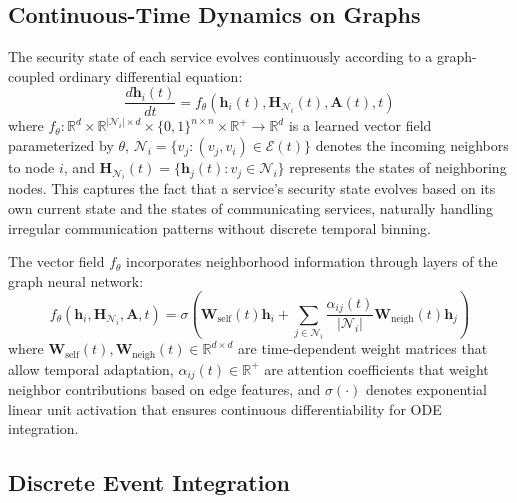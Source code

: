 \documentclass[lettersize,journal]{IEEEtran}
\newcommand{\R}{\mathbb{R}}
\begin{document}
\subsection{Continuous-Time Dynamics on Graphs}

The security state of each service evolves continuously according to a graph-coupled ordinary differential equation:
\begin{equation}
\frac{d\mathbf{h}_i(t)}{dt} = f_\theta(\mathbf{h}_i(t), \mathbf{H}_{\mathcal{N}_i}(t), \mathbf{A}(t), t)
\label{eq:graph_ode}
\end{equation}
where $f_\theta : \R^d \times \R^{|\mathcal{N}_i| \times d} \times \{0,1\}^{n \times n} \times \R^+ \rightarrow \R^d$ is a learned vector field parameterized by $\theta$, $\mathcal{N}_i = \{v_j : (v_j, v_i) \in \mathcal{E}(t)\}$ denotes the incoming neighbors to node $i$, and $\mathbf{H}_{\mathcal{N}_i}(t) = \{\mathbf{h}_j(t) : v_j \in \mathcal{N}_i\}$ represents the states of neighboring nodes. This captures the fact that a service's security state evolves based on its own current state and the states of communicating services, naturally handling irregular communication patterns without discrete temporal binning.

The vector field $f_\theta$ incorporates neighborhood information through layers of the graph neural network:
\begin{equation}
f_\theta(\mathbf{h}_i, \mathbf{H}_{\mathcal{N}_i}, \mathbf{A}, t) = \sigma\left(\mathbf{W}_{\text{self}}(t) \mathbf{h}_i + \sum_{j \in \mathcal{N}_i} \frac{\alpha_{ij}(t)}{|\mathcal{N}_i|} \mathbf{W}_{\text{neigh}}(t) \mathbf{h}_j\right)
\label{eq:vector_field}
\end{equation}
where $\mathbf{W}_{\text{self}}(t), \mathbf{W}_{\text{neigh}}(t) \in \R^{d \times d}$ are time-dependent weight matrices that allow temporal adaptation, $\alpha_{ij}(t) \in \R^+$ are attention coefficients that weight neighbor contributions based on edge features, and $\sigma(\cdot)$ denotes exponential linear unit activation that ensures continuous differentiability for ODE integration.

\subsection{Discrete Event Integration}
\end{document}

